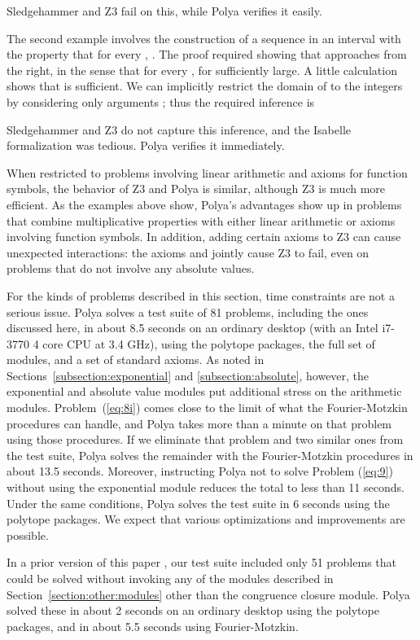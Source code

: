 \documentclass[runningheds]{llncs}
\begin{document}
Sledgehammer and Z3 fail on this, while Polya verifies it easily. 

The second example involves the construction of a sequence  in an interval  with the property that for every , . The proof required showing that  approaches  from the right, in the sense that for every ,  for  sufficiently large. A little calculation shows that  is sufficient. We can implicitly restrict the domain of  to the integers by considering only arguments ; thus the required inference is

Sledgehammer and Z3 do not capture this inference, and the Isabelle formalization was tedious. Polya verifies it immediately.

When restricted to problems involving linear arithmetic and axioms for function symbols, the behavior of Z3 and Polya is similar, although Z3 is much more efficient. As the examples above show, Polya's advantages show up in problems that combine multiplicative properties with either linear arithmetic or axioms involving function symbols. In addition, adding certain axioms to Z3 can cause unexpected interactions: the axioms  and  jointly cause Z3 to fail, even on problems that do not involve any absolute values.

For the kinds of problems described in this section, time constraints are not a serious issue. Polya solves a test suite of 81 problems, including the ones discussed here, in about 8.5 seconds on an ordinary desktop (with an Intel i7-3770 4 core CPU at 3.4 GHz), using the polytope packages, the full set of modules, and a set of standard axioms. As noted in Sections~\ref{subsection:exponential} and \ref{subsection:absolute}, however, the exponential and absolute value modules put additional stress on the arithmetic modules. Problem~(\ref{eq:8i}) comes close to the limit of what the Fourier-Motzkin procedures can handle, and Polya takes more than a minute on that problem using those procedures. If we eliminate that problem and two similar ones from the test suite, Polya solves the remainder with the Fourier-Motzkin procedures in about 13.5 seconds. Moreover, instructing Polya not to solve Problem (\ref{eq:9}) without using the exponential module reduces the total to less than 11 seconds. Under the same conditions, Polya solves the test suite in 6 seconds using the polytope packages. We expect that various optimizations and improvements are possible.

In a prior version of this paper \cite{avigad:lewis:roux:14}, our test suite included only 51 problems that could be solved without invoking any of the modules described in Section~\ref{section:other:modules} other than the congruence closure module. Polya solved these in about 2 seconds on an ordinary desktop using the polytope packages, and in about 5.5 seconds using Fourier-Motzkin. 
\end{document}
